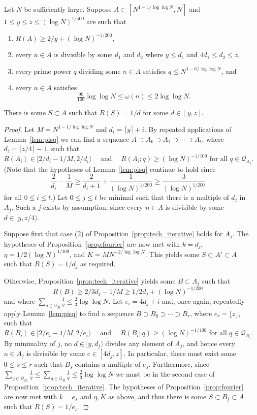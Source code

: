 \begin{proposition}\label{prop:techmain}
\leanok
Let $N$ be sufficiently large. Suppose $A\subset [N^{1-1/\log\log N},N]$ and $1\leq y\leq z\leq (\log N)^{1/500}$ are such that
\begin{enumerate}
\item $R(A)\geq 2/y+(\log N)^{-1/200}$,
\item every $n\in A$ is divisible by some $d_1$ and $d_2$ where $y\leq d_1$ and $4d_1\leq d_2\leq z$,
\item every prime power $q$ dividing some $n\in A$ satisfies $q\leq N^{1-6/\log\log N}$, and
\item every $n\in A$ satisfies
\[\tfrac{99}{100}\log\log N\leq \omega(n) \leq 2\log\log N.\]
\end{enumerate}
There is some $S\subset A$ such that $R(S)=1/d$ for some $d\in [y,z]$.
\end{proposition}
\begin{proof}
Let $M=N^{1-1/\log\log N}$ and $d_i = \lceil y \rceil +i$. By repeated applications of Lemma~\ref{lem:pisq} we can find a sequence $A\supset A_0\supset A_1\supset\cdots \supset A_{t}$, where $d_t=\lceil z/4\rceil-1$, such that
\[R(A_i)\in [2/d_i-1/M,2/d_i)\quad\textrm{ and }\quad R(A_i;q)\geq (\log N)^{-1/100}\textrm{ for all }q\in \mathcal{Q}_{A_i}.\]
(Note that the hypotheses of Lemma~\ref{lem:pisq} continue to hold since
\[\frac{2}{d_i}-\frac{1}{M}\geq \frac{2}{d_{i}+1}+\frac{1}{(\log N)^{1/200}}\geq \frac{3}{(\log N)^{1/200}}\]
for all $0\leq i\leq t$.) Let $0\leq j\leq t$ be minimal such that there is a multiple of $d_j$ in $A_j$. Such a $j$ exists by assumption, since every $n\in A$ is divisible by some $d\in[y,z/4)$.

Suppose first that case (2) of Proposition~\ref{prop:tech_iterative} holds for $A_j$. The hypotheses of Proposition~\ref{prop:fourier} are now met with $k=d_j$, $\eta=1/2(\log N)^{1/100}$, and $K=MN^{-2/\log \log N}$. This yields some $S\subset A'\subset A$ such that $R(S)=1/d_j$ as required.

Otherwise, Proposition~\ref{prop:tech_iterative} yields some $B\subset A_j$ such that
\[R(B)\geq 2/3d_j-1/M\geq 1/2d_j+(\log N)^{-1/200}\]
and where $\sum_{q\in\mathcal{Q}_B}\frac{1}{q}\leq \frac{2}{3}\log\log N$. Let $e_i = 4d_j+i$ and, once again, repeatedly apply Lemma~\ref{lem:pisq} to find a sequence $B\supset B_0\supset \cdots\supset B_r$, where $e_r=\lfloor z\rfloor$, such that
\[R(B_i)\in [2/e_i-1/M,2/e_i)\quad\textrm{ and }\quad R(B_i;q)\geq (\log N)^{-1/100}\textrm{ for all }q\in \mathcal{Q}_{B_i}.\]
By minimality of $j$, no $d\in [y,d_j)$ divides any element of $A_j$, and hence every $n\in A_j$ is divisible by some $e\in [4d_j,z]$. In particular, there must exist some $0\leq s\leq r$ such that $B_s$ contains a multiple of $e_s$. Furthermore, since $\sum_{q\in \mathcal{Q}_{B_s}}\frac{1}{q}\leq \sum_{q\in\mathcal{Q}_B}\frac{1}{q}\leq \frac{2}{3}\log\log N$ we must be in the second case of Proposition~\ref{prop:tech_iterative}. The hypotheses of Proposition~\ref{prop:fourier} are now met with $k=e_s$ and $\eta,K$ as above, and thus there is some $S\subset B_j\subset A$ such that $R(S)=1/e_s$.
\end{proof}












